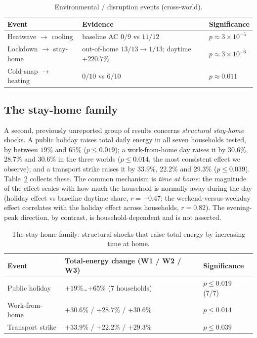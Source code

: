 \documentclass[11pt]{article}
\begin{document}
\begin{table}[h]
\centering
\small
\begin{tabular}{lll}
\toprule
\textbf{Event} & \textbf{Evidence} & \textbf{Significance} \\
\midrule
Heatwave $\rightarrow$ cooling & baseline AC $0/9$ vs $11/12$ & $p\approx3\times10^{-5}$ \\
Lockdown $\rightarrow$ stay-home & out-of-home $13/13\rightarrow1/13$; daytime $+220.7\%$ & $p\approx3\times10^{-6}$ \\
Cold-snap $\rightarrow$ heating & $0/10$ vs $6/10$ & $p\approx0.011$ \\
\bottomrule
\end{tabular}
\caption{Environmental / disruption events (cross-world).}
\label{tab:events}
\end{table}

\subsection{The stay-home family}
A second, previously unreported group of results concerns \emph{structural stay-home} shocks. A public
holiday raises total daily energy in all seven households tested, by between $19\%$ and $65\%$
($p\le0.019$); a work-from-home day raises it by $30.6\%$, $28.7\%$ and $30.6\%$ in the three worlds
($p\le0.014$, the most consistent effect we observe); and a transport strike raises it by $33.9\%$,
$22.2\%$ and $29.3\%$ ($p\le0.039$). Table~\ref{tab:stayhome} collects these. The common mechanism is
\emph{time at home}: the magnitude of the effect scales with how much the household is normally away
during the day (holiday effect vs baseline daytime share, $r=-0.47$; the weekend-versus-weekday effect
correlates with the holiday effect across households, $r=0.82$). The evening-peak direction, by contrast,
is household-dependent and is not asserted.

\begin{table}[h]
\centering
\small
\begin{tabular}{lll}
\toprule
\textbf{Event} & \textbf{Total-energy change (W1 / W2 / W3)} & \textbf{Significance} \\
\midrule
Public holiday & $+19\%$\ldots$+65\%$ (7 households) & $p\le0.019$ (7/7) \\
Work-from-home & $+30.6\%$ / $+28.7\%$ / $+30.6\%$ & $p\le0.014$ \\
Transport strike & $+33.9\%$ / $+22.2\%$ / $+29.3\%$ & $p\le0.039$ \\
\bottomrule
\end{tabular}
\caption{The stay-home family: structural shocks that raise total energy by increasing time at home.}
\label{tab:stayhome}
\end{table}
\end{document}

